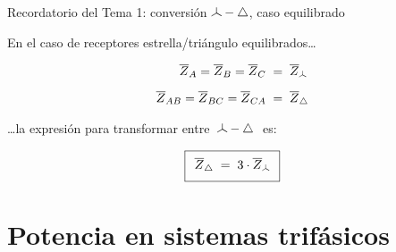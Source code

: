 \documentclass[aspectratio=169, usenames,svgnames,dvipsnames]{beamer}
\newcommand\wye{\scalerel*{\stackengine{-1pt}{%
  \rotatebox[origin=c]{30}{\rule{10pt}{.9pt}}\kern-1pt%
  \rotatebox[origin=c]{-30}{\rule{10pt}{1.3pt}}}{%
  \rule{.9pt}{10pt}}{O}{c}{F}{F}{S}}{\Delta}} %
\begin{document}

\begin{frame}{Recordatorio del Tema 1: \hspace{3mm}conversión $\wye - \triangle$, \hspace{3mm}caso equilibrado}
    
    En el caso de receptores estrella/triángulo \alert{equilibrados}\ldots{}

    \vspace{-5mm}
    \begin{align*}
      \overline{Z}_A = \overline{Z}_B = \overline{Z}_C \; &= \; \overline{Z}_{\wye}\\[5pt]
      \overline{Z}_{AB} = \overline{Z}_{BC} = \overline{Z}_{CA} \; &= \; \overline{Z}_{\triangle}
    \end{align*}

    \vspace{2mm}
    \ldots{}la expresión para \alert{transformar} entre $\; \wye - \triangle \;$ es:
    
    \begin{equation*}
      \boxed{\;\, \vphantom{\frac{a}{a}} \overline{Z}_{\triangle} 
      \; = \; 
      3\cdot \overline{Z}_{\wye} \;\,}
    \end{equation*}
\end{frame}


\section{Potencia en sistemas trifásicos}
\end{document}
